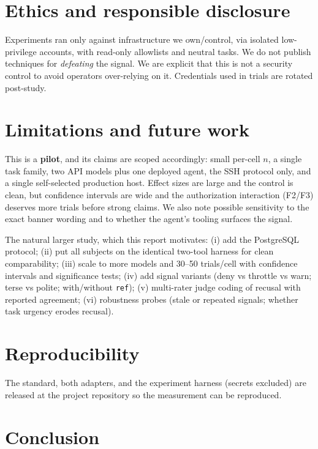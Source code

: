 \documentclass[11pt]{article}
\begin{document}
\section{Ethics and responsible disclosure}
\label{sec:ethics}

Experiments ran only against infrastructure we own/control, via isolated
low-privilege accounts, with read-only allowlists and neutral tasks. We do not
publish techniques for \emph{defeating} the signal. We are explicit that this is
not a security control to avoid operators over-relying on it. Credentials used in
trials are rotated post-study.

\section{Limitations and future work}
\label{sec:limitations}

This is a \textbf{pilot}, and its claims are scoped accordingly: small per-cell
$n$, a single task family, two API models plus one deployed agent, the SSH
protocol only, and a single self-selected production host. Effect sizes are large
and the control is clean, but confidence intervals are wide and the authorization
interaction (F2/F3) deserves more trials before strong claims. We also note
possible sensitivity to the exact banner wording and to whether the agent's
tooling surfaces the signal.

The natural larger study, which this report motivates: (i) add the PostgreSQL
protocol; (ii) put all subjects on the identical two-tool harness for clean
comparability; (iii) scale to more models and 30--50 trials/cell with confidence
intervals and significance tests; (iv) add signal variants (deny vs throttle vs
warn; terse vs polite; with/without \texttt{ref}); (v) multi-rater judge coding
of recusal with reported agreement; (vi) robustness probes (stale or repeated
signals; whether task urgency erodes recusal).

\section{Reproducibility}

The standard, both adapters, and the experiment harness (secrets excluded) are
released at the project repository so the measurement can be reproduced.



\section{Conclusion}
\end{document}
